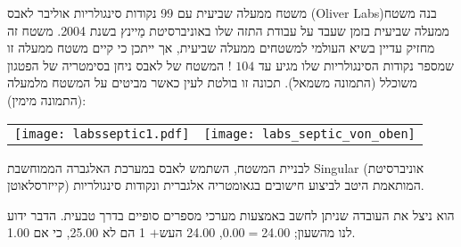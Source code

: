 \begin{surferPage}{%
משטח ממעלה שביעית עם 99 נקודות סינגולריות%
}
    אוליבר לאבס
    \textenglish{ (Oliver Labs)}בנה משטח ממעלה שביעית בזמן שעבד על
    עבודת התזה שלו באוניברסיטת מַיינץ בשנת 2004. משטח זה מחזיק עדיין בשיא העולמי למשטחים ממעלה שביעית,
    אך ייתכן כי קיים משטח ממעלה זו שמספר נקודות הסינגולריות שלו מגיע עד $104$
    !
    המשטח של לאבס ניחן בסימטריה של הפטגון משוכלל (התמונה משמאל).
    תכונה זו בולטת לעין כאשר מביטים על המשטח מלמעלה (התמונה מימין):

    \vspace*{-0.3em}
    \begin{center}
      \begin{tabular}{c@{\qquad}c}
        \texttt{[image: labsseptic1.pdf]}
        &
        \texttt{[image: labs\_septic\_von\_oben]}
      \end{tabular}
    \end{center}
    \vspace*{-0.3em}

    לבניית המשטח, השתמש לאבס במערכת האלגברה הממוחשבת
    {\sc Singular} (אוניברסיטת קייזרסלאוטן) המותאמת היטב
    לביצוע חישובים בגאומטריה אלגברית ונקודות סינגולריות.

    הוא ניצל את העובדה שניתן לחשב באמצעות מערכי מספרים סופיים
    בדרך טבעית. הדבר ידוע לנו מהשעון; 24.00$=$0.00, 24.00 $+ שעה $ 1 הם
    לא 25.00, כי אם 1.00.
\end{surferPage}
